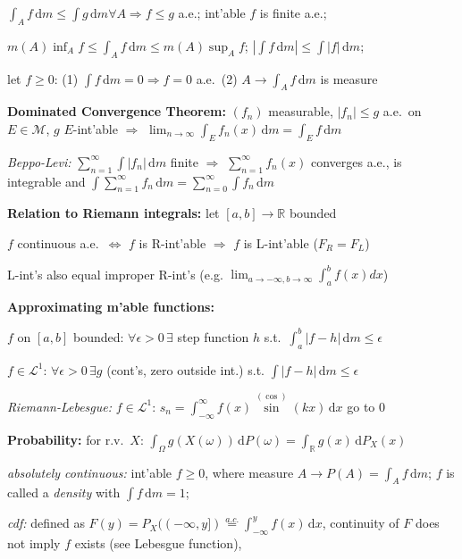 \documentclass[8pt,twoside]{extarticle}
\begin{document}
\begin{multicols}{2}
$\int_A f \, \mathrm{d}m \leq \int g \, \mathrm{d}m \forall A \Rightarrow f\leq g$ a.e.; int'able $f$ is finite a.e.; 

$m(A)\inf_A f \leq \int_A f \, \mathrm{d}m \leq m(A) \sup_A f$; $|\int f \, \mathrm{d}m| \leq \int |f| \, \mathrm{d}m$;

let $f\geq 0$: (1) $\int f \, \mathrm{d}m{=}0 \Rightarrow f{=}0$ a.e.\ (2) $A\to \int_A f \, \mathrm{d}m$ is  measure

\textbf{Dominated Convergence Theorem:} $(f_n)$ measurable, $|f_n|{\leq} g$ a.e.\ on $E{\in} \mathcal{M}$, $g$ $E$-int'able $\Rightarrow$  $\displaystyle\lim_{n\to\infty} \int_E f_n(x)\,\mathrm{d}m = \int_E f \,\mathrm{d}m$

\textit{Beppo-Levi:} $\sum_{n=1}^\infty \int |f_n| \,\mathrm{d}m$ finite $\Rightarrow$ $\sum_{n=1}^\infty f_n(x)$ converges a.e., is integrable and
$\int\sum_{n=1}^\infty f_n \,\mathrm{d}m = \sum_{n=0}^\infty \int f_n \,\mathrm{d}m$

\textbf{Relation to Riemann integrals:} let $[a,b] \to \mathbb{R}$ bounded

$f$ continuous a.e.\ $\Leftrightarrow$  $f$ is R-int'able $\Rightarrow$ $f$ is L-int'able ($F_R=F_L$)

L-int's also equal improper R-int's (e.g. $\displaystyle\lim_{a\to -\infty, b\to \infty} \int_a^b f(x)dx$)

\textbf{Approximating m'able functions:}

 $f$ on $[a,b]$ bounded: $\forall \epsilon>0\, \exists$ step function $h$ s.t.\ $\int_a^b|f{-}h|\,\mathrm{d}m\leq \epsilon$
 
 $f{\in} \mathcal{L}^1$: $\forall \epsilon{>}0 \, \exists g$ (cont's, zero outside int.) s.t. $\int|f{-}h|\,\mathrm{d}m\leq \epsilon$
 
 \textit{Riemann-Lebesgue:} $f{\in}\mathcal{L}^1$: $s_n {=} \int_{{-}\infty}^\infty f(x)\overset{(\cos)}{\sin} (kx)  \,\mathrm{d}x$ go to 0

\textbf{Probability:} for r.v.\ $X$: $\int_\Omega g(X(\omega))\,\mathrm{d}P(\omega) = \int_\mathbb{R} g(x)\,\mathrm{d}P_X(x)$

\textit{absolutely continuous:} int'able $f\geq 0$, where measure $A\to P(A)=\int_A f \,\mathrm{d}m$; $f$ is called a \textit{density} with $\int f \,\mathrm{d} m = 1$; 

\textit{cdf:} defined as $F(y)= P_X((-\infty, y])\overset{a.c.}{=}\int_{-\infty}^y f(x) \,\mathrm{d}x$,
 continuity of $F$ does not imply $f$ exists (see Lebesgue function), 


\end{multicols}
\end{document}

